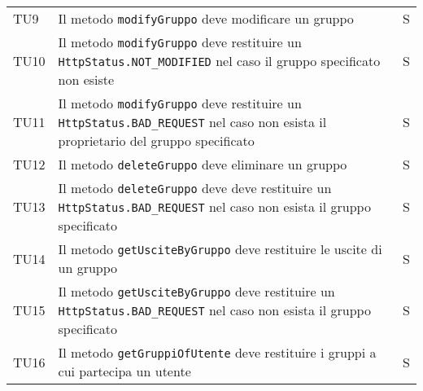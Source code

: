 \begin{center}
{\begin{longtable}{
      |>{\centering\arraybackslash}p{48pt}
      |>{\centering\arraybackslash}p{308pt}
      |>{\centering\arraybackslash}p{27pt}|}
      TU9                                                                        & Il metodo \texttt{modifyGruppo}
      deve modificare un gruppo                                                  & S                                              \\
      TU10                                                                       & Il metodo \texttt{modifyGruppo}
      deve restituire un \texttt{ HttpStatus.NOT\_MODIFIED} nel caso il gruppo
      specificato non esiste                                                     & S                                              \\
      TU11                                                                       & Il metodo \texttt{modifyGruppo}
      deve restituire un \texttt{ HttpStatus.BAD\_REQUEST} nel caso non esista il
      proprietario del gruppo specificato                                        & S                                              \\
      TU12                                                                       & Il metodo \texttt{deleteGruppo}
      deve eliminare un gruppo                                                   & S                                              \\
      TU13                                                                       & Il metodo \texttt{deleteGruppo}
      deve deve restituire un \texttt{ HttpStatus.BAD\_REQUEST} nel caso non esista
      il gruppo specificato                                                      & S                                              \\
      TU14                                                                       & Il metodo
      \texttt{getUsciteByGruppo} deve restituire le uscite di un gruppo          & S                                              \\
      TU15                                                                       & Il metodo
      \texttt{getUsciteByGruppo} deve restituire un \texttt{ HttpStatus.BAD\_REQUEST}
      nel caso non esista il gruppo specificato                                  & S                                              \\
      TU16                                                                       & Il metodo
      \texttt{getGruppiOfUtente} deve restituire i gruppi a cui partecipa un utente
                                                                                 & S                                              \\

\end{longtable}}
\end{center}
